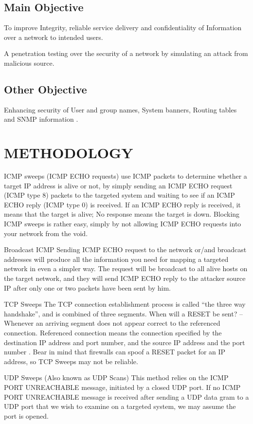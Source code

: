 \documentclass{article}
\begin{document}
\subsection{Main Objective}\label{sec:into}
To   improve Integrity, reliable service delivery and confidentiality of   Information over a network to intended users.


A penetration testing over the  security  of a network by simulating an attack from malicious source.


\subsection{Other Objective}\label{sec:into}
 Enhancing   security of User and group names, System banners, Routing tables
and   SNMP  information .


\section{METHODOLOGY}\label{sec:into}

ICMP sweeps (ICMP ECHO requests)
use ICMP packets to determine whether a target IP address is alive or not, by simply
sending an ICMP ECHO request (ICMP type 8) packets to the targeted system and waiting to
see if an ICMP ECHO reply (ICMP type 0) is received. If an ICMP ECHO reply is received, it
means that the target is alive; No response means the target is down.
Blocking ICMP sweeps is rather easy, simply by not allowing ICMP ECHO requests into your
network from the void.


Broadcast ICMP
Sending ICMP ECHO request to the network or/and broadcast addresses will produce all the
information you need for mapping a targeted network in even a simpler way.
The request will be broadcast to all alive hosts on the target network, and they will send ICMP
ECHO reply to the attacker source IP after only one or two packets have been sent by him.


TCP Sweeps
The TCP connection establishment process is called “the three way handshake”, and is
combined of three segments.
When will a RESET be sent? – Whenever an arriving segment does not appear correct to the
referenced connection. Referenced connection means the connection specified by the
destination IP address and port number, and the source IP address and the port number .
Bear in mind that firewalls can spoof a RESET packet for an IP address, so TCP Sweeps may
not be reliable.


UDP Sweeps (Also known as UDP Scans)
This method relies on the ICMP PORT UNREACHABLE message, initiated by a closed UDP
port. If no ICMP PORT UNREACHABLE message is received after sending a UDP data gram
to a UDP port that we wish to examine on a targeted system, we may assume the port is
opened.
\end{document}
